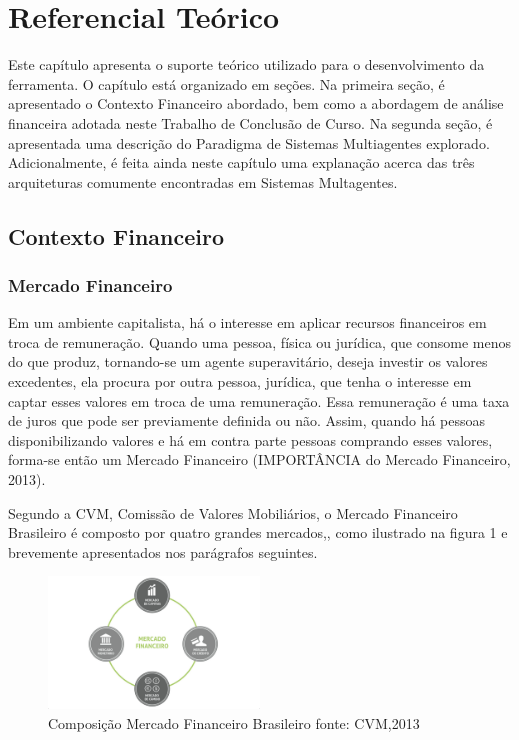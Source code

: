 
\newpage
\chapter[REFERENCIAL TEÓRICO]{Referencial Teórico}


Este capítulo apresenta o suporte teórico utilizado para o desenvolvimento da ferramenta. O capítulo está organizado em seções. Na primeira seção, é apresentado o Contexto Financeiro abordado, bem como a abordagem de análise financeira adotada neste Trabalho de Conclusão de Curso. Na segunda seção, é apresentada uma descrição do Paradigma de Sistemas Multiagentes explorado. Adicionalmente, é feita ainda neste capítulo uma explanação acerca das três arquiteturas comumente encontradas em Sistemas Multagentes.


\section{Contexto Financeiro}
\subsection{Mercado Financeiro}

Em um ambiente capitalista, há o interesse em aplicar recursos financeiros em troca de remuneração. Quando uma pessoa, física ou jurídica, que consome menos do que produz, tornando-se um agente superavitário, deseja investir os valores excedentes, ela procura por outra pessoa, jurídica, que tenha o interesse em captar esses valores em troca de uma remuneração. Essa remuneração é uma taxa de juros que pode ser previamente definida ou não. Assim, quando há pessoas disponibilizando valores e há em contra parte pessoas comprando esses valores, forma-se então um Mercado Financeiro (IMPORTÂNCIA do Mercado Financeiro, 2013).

Segundo a CVM, Comissão de Valores Mobiliários, o Mercado Financeiro Brasileiro é composto por quatro grandes mercados,\cite[p. 15]{cmv2014}, como ilustrado na figura 1 e brevemente apresentados nos parágrafos seguintes.

\begin{figure}[h]
\centering
\label{f01}
\includegraphics[width=0.5\textwidth]{figuras/f01}
\caption{Composição Mercado Financeiro Brasileiro  \newline fonte: CVM,2013}

\end{figure}

